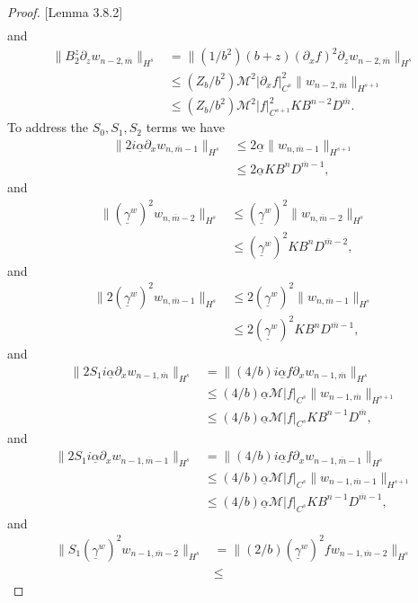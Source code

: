 \begin{proof}{[Lemma 3.8.2]}
\begin{align*}
\end{align*}
and
\begin{align*}
\|B_2^{z}\partial_z w_{n-2,\overline{m}}\|_{H^{s}} &= 
\|(1/b^2)(b+z)(\partial_x f)^2\partial_z w_{n-2,\overline{m}}\|_{H^{s}}\\&\le
(Z_b/b^2)\mathcal{M}^2|\partial_x f|_{C^{s}}^2\|w_{n-2, \overline{m}}\|_{H^{s+1}} \\&\le
(Z_b/b^2)\mathcal{M}^2|f|_{C^{s+1}}^2KB^{n-2}D^{\overline{m}}.
\end{align*}
To address the $S_0,S_1,S_2$ terms we have
\begin{align*}
\|2i\underline{\alpha}\partial_xw_{n,\overline{m}-1}\|_{H^{s}}&\le
2\underline{\alpha}\|w_{n, \overline{m}-1}\|_{H^{s+1}}\\&\le
2\underline{\alpha}KB^{n}D^{\overline{m}-1},
\end{align*}
and
\begin{align*}
\|(\underline{\gamma}^w)^2w_{n,\overline{m}-2}\|_{H^{s}}&\le
(\underline{\gamma}^w)^2\|w_{n,\overline{m}-2}\|_{H^{s}}\\&\le
(\underline{\gamma}^w)^2KB^{n}D^{\overline{m}-2},
\end{align*}
and
\begin{align*}
\|2(\underline{\gamma}^w)^2w_{n,\overline{m}-1}\|_{H^{s}}&\le
2(\underline{\gamma}^w)^2\|w_{n,\overline{m}-1}\|_{H^{s}}\\&\le
2(\underline{\gamma}^w)^2KB^{n}D^{\overline{m}-1},
\end{align*}
and
\begin{align*}
\|2S_1i\underline{\alpha}\partial_xw_{n-1,\overline{m}}\|_{H^{s}}&=\|(4/b)i\underline{\alpha}f\partial_xw_{n-1,\overline{m}}\|_{H^{s}}\\&\le
(4/b)\underline{\alpha}\mathcal{M}|f|_{C^{s}}\|w_{n-1, \overline{m}}\|_{H^{s+1}}\\&\le
(4/b)\underline{\alpha}\mathcal{M}|f|_{C^{s}}KB^{n-1}D^{\overline{m}},
\end{align*}
and
\begin{align*}
\|2S_1i\underline{\alpha}\partial_xw_{n-1,\overline{m}-1}\|_{H^{s}}&=\|(4/b)i\underline{\alpha}f\partial_xw_{n-1,\overline{m}-1}\|_{H^{s}}\\&\le
(4/b)\underline{\alpha}\mathcal{M}|f|_{C^{s}}\|w_{n-1, \overline{m}-1}\|_{H^{s+1}}\\&\le
(4/b)\underline{\alpha}\mathcal{M}|f|_{C^{s}}KB^{n-1}D^{\overline{m}-1},
\end{align*}
and
\begin{align*}
\|S_1(\underline{\gamma}^w)^2w_{n-1,\overline{m}-2}\|_{H^{s}}&=\|(2/b)(\underline{\gamma}^w)^2fw_{n-1,\overline{m}-2}\|_{H^{s}}\\&\le

\end{align*}
\end{proof}
